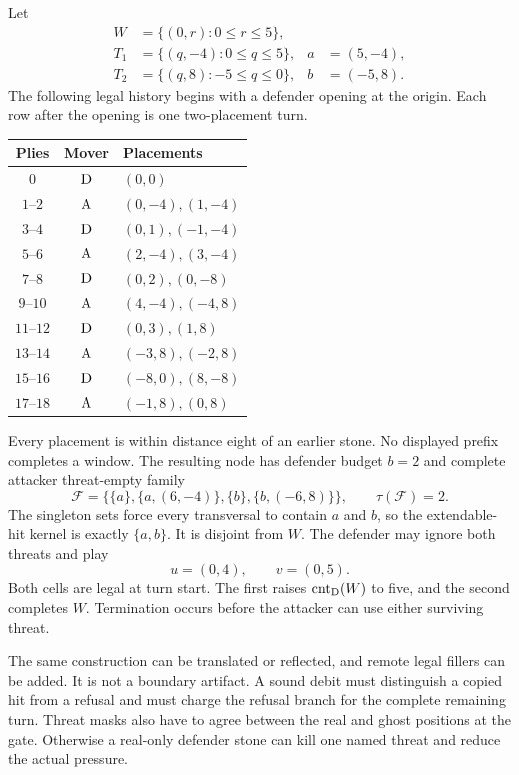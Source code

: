\begin{example}
Let
\[
\begin{aligned}
W&=\{(0,r):0\le r\le5\},\\
T_1&=\{(q,-4):0\le q\le5\}, &a&=(5,-4),\\
T_2&=\{(q,8):-5\le q\le0\}, &b&=(-5,8).
\end{aligned}
\]
The following legal history begins with a defender opening at the origin.
Each row after the opening is one two-placement turn.
\begin{center}
\small
\begin{tabular}{@{}ccl@{}}
\toprule
Plies & Mover & Placements \\
\midrule
$0$ & $\mathrm{D}$ & $(0,0)$ \\
$1$--$2$ & $\mathrm{A}$ & $(0,-4),(1,-4)$ \\
$3$--$4$ & $\mathrm{D}$ & $(0,1),(-1,-4)$ \\
$5$--$6$ & $\mathrm{A}$ & $(2,-4),(3,-4)$ \\
$7$--$8$ & $\mathrm{D}$ & $(0,2),(0,-8)$ \\
$9$--$10$ & $\mathrm{A}$ & $(4,-4),(-4,8)$ \\
$11$--$12$ & $\mathrm{D}$ & $(0,3),(1,8)$ \\
$13$--$14$ & $\mathrm{A}$ & $(-3,8),(-2,8)$ \\
$15$--$16$ & $\mathrm{D}$ & $(-8,0),(8,-8)$ \\
$17$--$18$ & $\mathrm{A}$ & $(-1,8),(0,8)$ \\
\bottomrule
\end{tabular}
\end{center}
Every placement is within distance eight of an earlier stone.  No displayed
prefix completes a window.  The resulting node has defender budget $b=2$ and
complete attacker threat-empty family
\[
\mathcal F=\bigl\{\{a\},\{a,(6,-4)\},
                    \{b\},\{b,(-6,8)\}\bigr\},
\qquad \tau(\mathcal F)=2.
\]
The singleton sets force every transversal to contain $a$ and $b$, so the
extendable-hit kernel is exactly $\{a,b\}$.  It is disjoint from $W$.
The defender may ignore both threats and play
\[
u=(0,4),\qquad v=(0,5).
\]
Both cells are legal at turn start.  The first raises $\operatorname{cnt}_{\mathrm{D}}(W)$ to five,
and the second completes $W$.  Termination occurs before the attacker can use
either surviving threat.
\end{example}

The same construction can be translated or reflected, and remote legal
fillers can be added.  It is not a boundary artifact.  A sound debit must
distinguish a copied hit from a refusal and must charge the refusal branch for
the complete remaining turn.  Threat masks also have to agree between the
real and ghost positions at the gate.  Otherwise a real-only defender stone
can kill one named threat and reduce the actual pressure.

